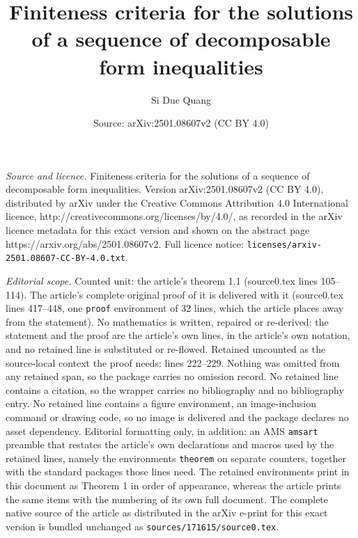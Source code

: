 \documentclass[10pt,a4paper]{amsart}
\title{Finiteness criteria for the solutions of a sequence of decomposable form inequalities}
\author{Si Duc Quang}
\date{Source: arXiv:2501.08607v2 (CC BY 4.0)}
\begin{document}
\maketitle

\noindent\emph{Source and licence.} Finiteness criteria for the solutions of a sequence of decomposable form inequalities. Version arXiv:2501.08607v2 (CC BY 4.0), distributed by arXiv under the Creative Commons Attribution 4.0 International licence, http://creativecommons.org/licenses/by/4.0/, as recorded in the arXiv licence metadata for this exact version and shown on the abstract page https://arxiv.org/abs/2501.08607v2. Full licence notice: \texttt{licenses/arxiv-2501.08607-CC-BY-4.0.txt}.\par\smallskip

\noindent\textit{Editorial scope.} Counted unit: the article's theorem 1.1 (source0.tex lines 105--114). The article's complete original proof of it is delivered with it (source0.tex lines 417--448, one \texttt{proof} environment of 32 lines, which the article places away from the statement). No mathematics is written, repaired or re-derived: the statement and the proof are the article's own lines, in the article's own notation, and no retained line is substituted or re-flowed.  Retained uncounted as the source-local context the proof needs: lines 222--229.  Nothing was omitted from any retained span, so the package carries no omission record.  No retained line contains a citation, so the wrapper carries no bibliography and no bibliography entry.  No retained line contains a figure environment, an image-inclusion command or drawing code, so no image is delivered and the package declares no asset dependency.  Editorial formatting only, in addition: an AMS \texttt{amsart} preamble that restates the article's own declarations and macros used by the retained lines, namely the environments \texttt{theorem} on separate counters, together with the standard packages those lines need.  The retained environments print in this document as Theorem 1 in order of appearance, whereas the article prints the same items with the numbering of its own full document.  The complete native source of the article as distributed in the arXiv e-print for this exact version is bundled unchanged as \texttt{sources/171615/source0.tex}.
\end{document}
